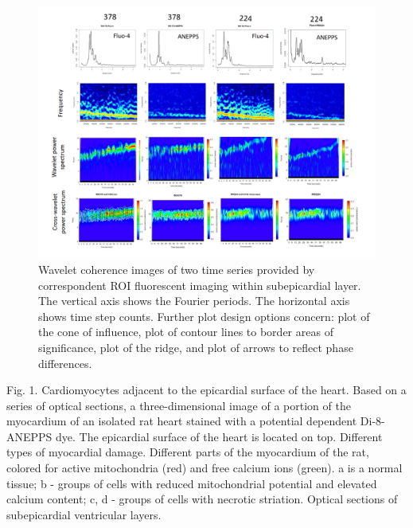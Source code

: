 \documentclass{biophys-new}
\begin{document}
\begin{figure}[hbt!]
\centering
\includegraphics[width=0.8\linewidth]{fig10.png}
\caption{Wavelet coherence images of two time series provided by correspondent ROI fluorescent imaging within subepicardial layer.
The vertical axis shows the Fourier periods. The horizontal axis shows time step counts.
Further plot design options concern: plot of the cone of influence, plot of contour lines to border areas of significance, plot of the ridge, and plot of arrows to reflect phase differences.}
\label{fig:fig10}
\end{figure}


Fig. 1. Cardiomyocytes adjacent to the epicardial surface of the heart.
Based on a series of optical sections, a three-dimensional image of a portion of the myocardium of an isolated rat heart stained with a potential dependent Di-8-ANEPPS dye.
The epicardial surface of the heart is located on top.
Different types of myocardial damage.
Different parts of the myocardium of the rat, colored for active mitochondria (red) and free calcium ions (green). a is a normal tissue; b - groups of cells with reduced mitochondrial potential and elevated calcium content; c, d - groups of cells with necrotic striation. Optical sections of subepicardial ventricular layers.
\end{document}
